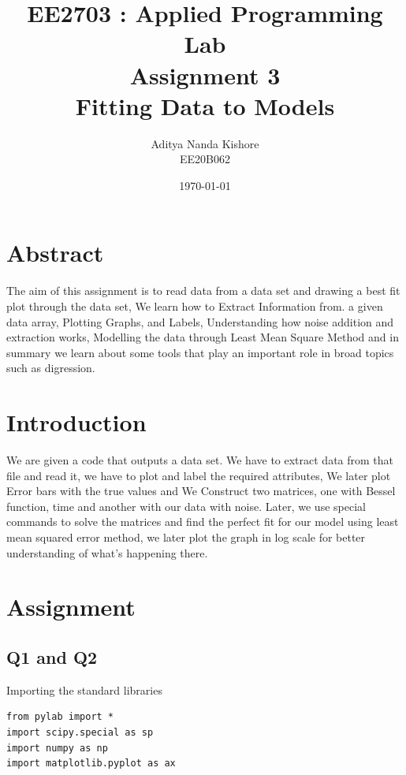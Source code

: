 \documentclass[12pt, a4paper]{report}
\title{\textbf{EE2703 : Applied Programming Lab \\ Assignment 3 \\ Fitting Data to Models}}
\author{Aditya Nanda Kishore\\ EE20B062}
\date{\today} %
\begin{document}
		
\maketitle
\section{Abstract}
The aim of this assignment is to read data from a data set and drawing a best fit plot through the data set, We learn how to Extract Information from. a given data array, Plotting Graphs, and Labels, Understanding how noise addition and extraction works, Modelling the data through Least Mean Square Method and in summary we learn about some tools that play an important role in broad topics such as digression. 



\section{Introduction}
We are given a code that outputs a data set. We have to extract data from that file and read it, we have to plot and label the required attributes, We later plot Error bars with the true values and We Construct two matrices, one with Bessel function, time and another with our data with noise. Later, we use special commands to solve the matrices and find the perfect fit for our model using least mean squared error method, we later plot the graph in log scale for better understanding of what's happening there.

\section{Assignment}
\subsection{ Q1 and Q2}
Importing the standard libraries
\begin{Verbatim}
from pylab import *
import scipy.special as sp
import numpy as np
import matplotlib.pyplot as ax
\end{Verbatim}
\end{document}
